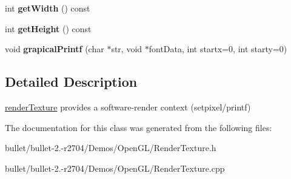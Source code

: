 \begin{DoxyCompactItemize}
\item 
\hypertarget{classrender_texture_a35b735be3394f656b5bbe3c042651f01}{int {\bfseries get\+Width} () const }\label{classrender_texture_a35b735be3394f656b5bbe3c042651f01}

\item 
\hypertarget{classrender_texture_aa821b70bb60c73bcdfc87c30453c7810}{int {\bfseries get\+Height} () const }\label{classrender_texture_aa821b70bb60c73bcdfc87c30453c7810}

\item 
\hypertarget{classrender_texture_aff747c2f1df5738ef2542be0923e46d1}{void {\bfseries grapical\+Printf} (char $\ast$str, void $\ast$font\+Data, int startx=0, int starty=0)}\label{classrender_texture_aff747c2f1df5738ef2542be0923e46d1}

\end{DoxyCompactItemize}


\subsection{Detailed Description}
\hyperlink{classrender_texture}{render\+Texture} provides a software-\/render context (setpixel/printf) 

The documentation for this class was generated from the following files\+:\begin{DoxyCompactItemize}
\item 
bullet/bullet-\/2.-\/r2704/\+Demos/\+Open\+G\+L/Render\+Texture.\+h\item 
bullet/bullet-\/2.-\/r2704/\+Demos/\+Open\+G\+L/Render\+Texture.\+cpp\end{DoxyCompactItemize}
